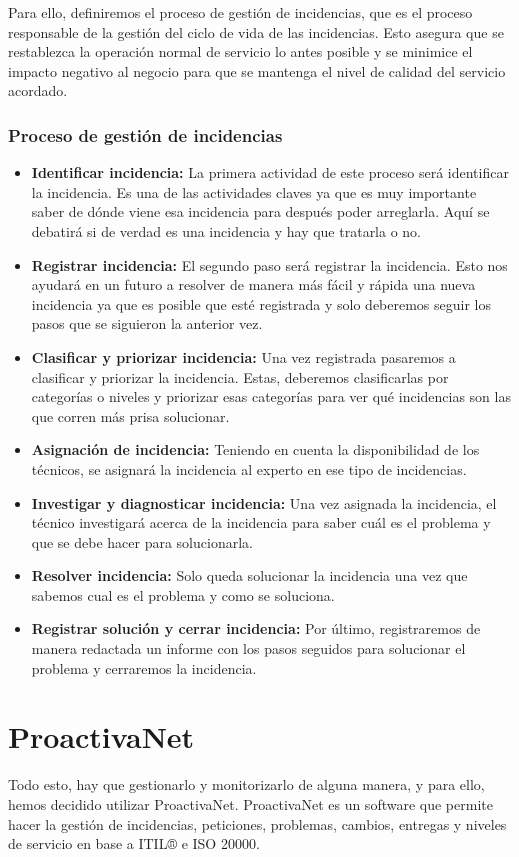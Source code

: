 Para ello, definiremos el proceso de gestión de incidencias, que es el
proceso responsable de la gestión del ciclo de vida de las
incidencias. Esto asegura que se restablezca la operación normal de
servicio lo antes posible y se minimice el impacto negativo al negocio
para que se mantenga el nivel de calidad del servicio acordado.
\subsubsection{Proceso de gestión de incidencias}
\begin{itemize}
\item{\textbf{Identificar incidencia:}} La primera actividad de este
  proceso será identificar la incidencia. Es una de las actividades
  claves ya que es muy importante saber de dónde viene esa incidencia
  para después poder arreglarla. Aquí se debatirá si de verdad es una
  incidencia y hay que tratarla o no.
\item {\textbf{Registrar incidencia:}} El segundo paso será registrar
  la incidencia. Esto nos ayudará en un futuro a resolver de manera
  más fácil y rápida una nueva incidencia ya que es posible que esté
  registrada y solo deberemos seguir los pasos que se siguieron la
  anterior vez.
\item{\textbf{Clasificar y priorizar incidencia:}} Una vez registrada
  pasaremos a clasificar y priorizar la incidencia. Estas, deberemos
  clasificarlas por categorías o niveles y priorizar esas categorías
  para ver qué incidencias son las que corren más prisa solucionar.
\item{\textbf{Asignación de incidencia:}} Teniendo en cuenta la
  disponibilidad de los técnicos, se asignará la incidencia al experto
  en ese tipo de incidencias.
\item{\textbf{Investigar y diagnosticar incidencia:}} Una vez asignada
  la incidencia, el técnico investigará acerca de la incidencia para
  saber cuál es el problema y que se debe hacer para solucionarla.
\item{\textbf{Resolver incidencia:}} Solo queda solucionar la
  incidencia una vez que sabemos cual es el problema y como se
  soluciona.
\item{\textbf{Registrar solución y cerrar incidencia:}} Por último,
  registraremos de manera redactada un informe con los pasos seguidos
  para solucionar el problema y cerraremos la incidencia.
\end{itemize}

\section{ProactivaNet}
Todo esto, hay que gestionarlo y monitorizarlo de alguna manera, y para ello, hemos decidido utilizar ProactivaNet. ProactivaNet es un software que permite hacer la gestión de incidencias, peticiones, problemas, cambios, entregas y niveles de servicio en base a ITIL® e ISO 20000. 

